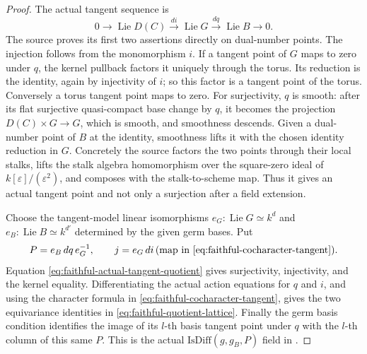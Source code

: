 \begin{proof}
The actual tangent sequence is
\[
       0\longrightarrow\operatorname{Lie}D(C)
        \stackrel{di}\longrightarrow\operatorname{Lie}G
        \stackrel{dq}\longrightarrow\operatorname{Lie}B
        \longrightarrow0 .
 \tag{QL4}\label{eq:faithful-actual-tangent-quotient}
\]
The source proves its first two assertions directly on
dual-number points.
The injection follows from the monomorphism \(i\).
If a tangent point of \(G\) maps to zero under \(q\), the
kernel pullback factors it uniquely through the torus.
Its reduction is the identity, again by injectivity of \(i\);
so this factor is a tangent point of the torus.
Conversely a torus tangent point maps to zero.
For surjectivity, \(q\) is smooth: after its flat surjective
quasi-compact base change by \(q\), it becomes the projection
\(D(C)\times G\to G\), which is smooth, and smoothness descends.
Given a dual-number point of \(B\) at the identity, smoothness
lifts it with the chosen identity reduction in \(G\).
Concretely the source factors the two points through their
local stalks, lifts the stalk algebra homomorphism over the
square-zero ideal of \(k[\varepsilon]/(\varepsilon^2)\), and
composes with the stalk-to-scheme map.
Thus it gives an actual tangent point and not only a
surjection after a field extension.

Choose the tangent-model linear isomorphisms
\(e_G:\operatorname{Lie}G\simeq k^d\) and
\(e_B:\operatorname{Lie}B\simeq k^{d'}\) determined by
the given germ bases.  Put
\[
             P=e_B\,dq\,e_G^{-1},\qquad
             j=e_G\,di\,(\text{map in \eqref{eq:faithful-cocharacter-tangent}}).
\]
Equation \eqref{eq:faithful-actual-tangent-quotient} gives
surjectivity, injectivity, and the kernel equality.
Differentiating the actual action equations for \(q\) and
\(i\), and using the character formula in
\eqref{eq:faithful-cocharacter-tangent}, gives the two
equivariance identities in \eqref{eq:faithful-quotient-lattice}.
Finally the germ basis condition identifies the image of
its \(l\)-th basis tangent point under \(q\) with the \(l\)-th
column of this same \(P\).  This is the actual
\(\mathrm{IsDiff}(g,g_B,P)\) field in .
\end{proof}

